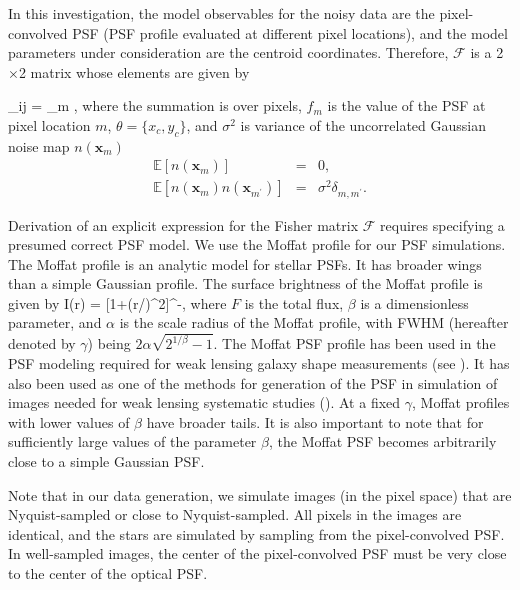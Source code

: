  
In this investigation, the model observables for the noisy data are the pixel-convolved PSF (PSF profile evaluated at different pixel locations), and  
the model parameters under consideration are the centroid coordinates. Therefore, $\mathcal{F}$
is a 2$\times$2 matrix whose elements are given by

\beq
  _{ij} = \sum_{m}
                ,
\label{fish}
\eeq
where the summation is over pixels, $f_{m}$ is the value of the PSF at pixel location $m$,
$\theta=\{x_{c},y_{c}\}$, and $\sigma^{2}$ is variance of the uncorrelated Gaussian noise map $n(\mathbf{x}_{m})$
\begin{eqnarray}
\mathbb{E}[n(\mathbf{x}_{m})] &=& 0, \\
\mathbb{E}[n(\mathbf{x}_{m})n(\mathbf{x}_{m^{\prime}})] &=& \sigma^{2}\delta_{m,m^{\prime}}. 
\end{eqnarray}

Derivation of an explicit expression for the Fisher matrix $\mathcal{F}$ requires 
specifying a presumed correct PSF model.
We use the Moffat profile \citep{moffat} for our PSF simulations. 
The Moffat profile is an analytic model for stellar PSFs. It has broader wings than
a simple Gaussian profile. The surface brightness of the Moffat profile is given by
\beq
I(r) = [1+(r/\alpha)^{2}]^{-\beta},
\label{mof}
\eeq
where $F$ is the total flux, $\beta$ is a dimensionless parameter, and $\alpha$ is
the scale radius of the Moffat profile, with FWHM (hereafter denoted by $\gamma$)
being $2\alpha\sqrt{2^{1/\beta}-1}$. The Moffat PSF profile has been used in the PSF modeling required for weak lensing galaxy shape measurements (see \citealt{im3shape,im3shape_code}). It has also been used as one of the methods for generation of the PSF in simulation of images needed for weak lensing systematic studies (\citealt{galsim}).
At a fixed $\gamma$, Moffat profiles with lower values
of $\beta$ have broader tails. It is also important to note that for sufficiently large values of the 
parameter $\beta$, the Moffat PSF becomes arbitrarily close to a simple Gaussian PSF. 

Note that in our data generation, we simulate images (in the pixel space) that are Nyquist-sampled or close to Nyquist-sampled. All pixels in the images are identical, and the stars are simulated 
by sampling from the pixel-convolved PSF. In well-sampled images, the center of 
the pixel-convolved PSF must be very close to the center of the optical PSF.
 
